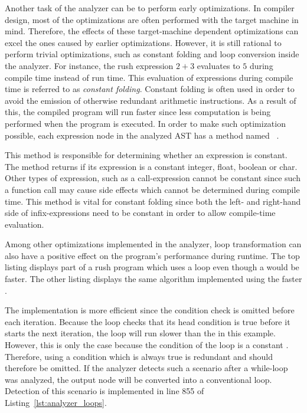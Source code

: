 Another task of the analyzer can be to perform early optimizations.
In compiler design, most of the optimizations are often performed with the target machine in mind.
Therefore, the effects of these target-machine dependent optimizations can excel the ones caused by earlier optimizations.
However, it is still rational to perform trivial optimizations, such as constant folding and loop conversion inside the analyzer.
For instance, the rush expression $2 + 3$ evaluates to $5$ during compile time instead of run time.
This evaluation of expressions during compile time is referred to as \emph{constant folding}.
Constant folding is often used in order to avoid the emission of otherwise redundant arithmetic instructions.
As a result of this, the compiled program will run faster since less computation is being performed when the program is executed.
In order to make such optimization possible, each expression node in the analyzed AST has a method named ~\cite[p.~54]{wirth_compiler_construction_2005}.


This method is responsible for determining whether an expression is constant.
The method returns  if its expression is a constant integer, float, boolean or char.
Other types of expression, such as a call-expression cannot be constant since such a function call may cause side effects which cannot be determined during compile time.
This method is vital for constant folding since both the left- and right-hand side of infix-expressions need to be constant in order to allow compile-time evaluation.

Among other optimizations implemented in the analyzer, loop transformation can also have a positive effect on the program's performance during runtime.
The top listing displays part of a rush program which uses a  loop even though a  would be faster.
The other listing displays the same algorithm implemented using the faster .


The  implementation is more efficient since the condition check is omitted before each iteration.
Because the  loop checks that its head condition is true before it starts the next iteration,
the  loop will run slower than the  in this example.
However, this is only the case because the condition of the loop is a constant .
Therefore, using a condition which is always true is redundant and should therefore be omitted.
If the analyzer detects such a scenario after a while-loop was analyzed, the output node will be converted into a conventional loop.
Detection of this scenario is implemented in line 855 of Listing~\ref{lst:analyzer_loops}.


